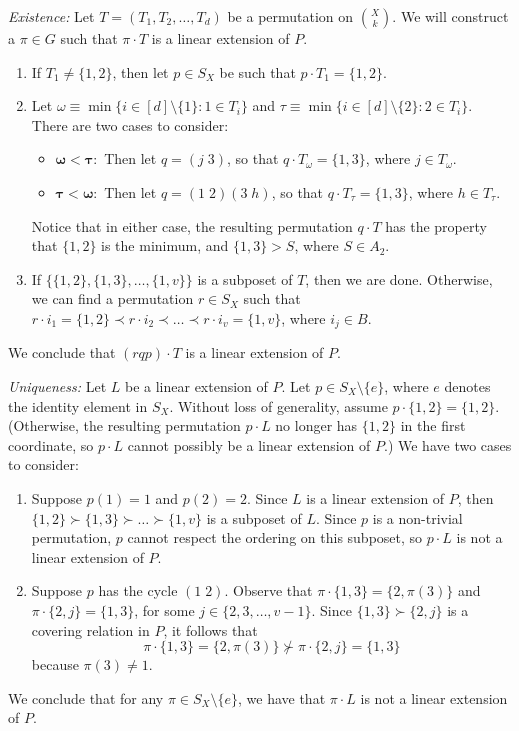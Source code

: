 \textit{Existence:} Let $T = (T_1, T_2, \dots , T_d)$ be a permutation on $\binom{X}{k}$. We will construct a $\pi\in G$ such that $\pi\cdot T$ is a linear extension of $P$.

\begin{enumerate}
\item If $T_1 \neq \{1,2\}$, then let $p\in S_X$ be such that $p\cdot T_1 = \{1,2\}$.
\item Let $\omega \equiv \min\{i\in[d]\setminus\{1\} : 1\in T_i\}$ and $\tau \equiv \min\{i\in[d]\setminus\{2\} : 2 \in T_i\}$. There are two cases to consider:
    \begin{itemize}
    \item $\mathbf{\omega < \tau:}$ Then let $q = (j\;3)$, so that $q \cdot T_\omega = \{1, 3\}$, where $j\in T_\omega$.
    \item $\mathbf{\tau < \omega:}$ Then let $q = (1 \; 2)(3 \; h)$, so that $q \cdot T_\tau = \{1, 3\}$, where $h \in T_\tau$.
    \end{itemize}
Notice that in either case, the resulting permutation $q \cdot T$ has the property that $\{1,2\}$ is the minimum, and $\{1,3\} > S$, where $S\in A_2$.

\item If $\{\{1, 2\}, \{1, 3\}, \dots , \{1, v\} \}$ is a subposet of $T$, then we are done. Otherwise, we can find a permutation $r\in S_X$ such that $r\cdot i_1 = \{1,2\} \prec r \cdot i_2 \prec \dots \prec r \cdot i_v = \{1, v\}$, where $i_j \in B$.
\end{enumerate}

We conclude that $(rqp) \cdot T$ is a linear extension of $P$.

\textit{Uniqueness:} Let $L$ be a linear extension of $P$. Let $p \in S_X \setminus \{e\}$, where $e$ denotes the identity element in $S_X$. Without loss of generality, assume $p \cdot \{1, 2\} = \{1, 2\}$. (Otherwise, the resulting permutation $p\cdot L$ no longer has $\{1, 2\}$ in the first coordinate, so $p\cdot L$ cannot possibly be a linear extension of $P$.) We have two cases to consider:

\begin{enumerate}
\item Suppose $p(1) = 1$ and $p(2) = 2$. Since $L$ is a linear extension of $P$, then $\{1, 2\} \succ \{1, 3\} \succ \dots \succ \{1, v\}$ is a subposet of $L$. Since $p$ is a non-trivial permutation, $p$ cannot respect the ordering on this subposet, so $p\cdot L$ is not a linear extension of $P$.
\item Suppose $p$ has the cycle $(1 \; 2)$. Observe that $\pi \cdot \{1, 3 \} = \{2, \pi(3)\}$ and $\pi \cdot \{2, j\} = \{1, 3\}$, for some $j\in\{2, 3, \dots, v-1\}$. Since $\{1,3\} \succ \{2, j\}$ is a covering relation in $P$, it follows that \[\pi \cdot \{1, 3\} = \{2, \pi(3)\} \not\succ \pi\cdot \{2, j\} = \{1, 3\}\] because $\pi(3) \neq 1$.
\end{enumerate}

We conclude that for any $\pi\in S_X \setminus\{e\}$, we have that $\pi \cdot L$ is not a linear extension of $P$.